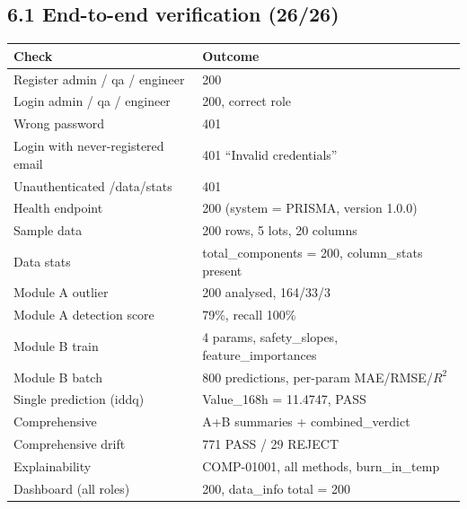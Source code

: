 \documentclass[11pt,a4paper]{article}
\begin{document}
\subsection*{6.1 End-to-end verification (26/26)}
\begin{center}
\begin{tabular}{@{}ll@{}}
\toprule
\textbf{Check} & \textbf{Outcome}\\
\midrule
Register admin / qa / engineer & 200\\
Login admin / qa / engineer & 200, correct role\\
Wrong password & 401\\
Login with never-registered email & 401 ``Invalid credentials''\\
Unauthenticated /data/stats & 401\\
Health endpoint & 200 (system = PRISMA, version 1.0.0)\\
Sample data & 200 rows, 5 lots, 20 columns\\
Data stats & total\_components = 200, column\_stats present\\
Module A outlier & 200 analysed, 164/33/3\\
Module A detection score & 79\%, recall 100\%\\
Module B train & 4 params, safety\_slopes, feature\_importances\\
Module B batch & 800 predictions, per-param MAE/RMSE/$R^2$\\
Single prediction (iddq) & Value\_168h = 11.4747, PASS\\
Comprehensive & A+B summaries + combined\_verdict\\
Comprehensive drift & 771 PASS / 29 REJECT\\
Explainability & COMP-01001, all methods, burn\_in\_temp\\
Dashboard (all roles) & 200, data\_info total = 200\\
\bottomrule
\end{tabular}
\end{center}
\end{document}
